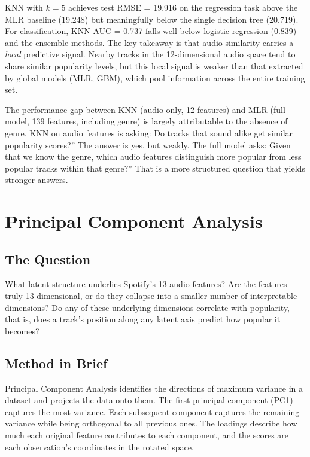 \documentclass[12pt, oneside]{book}
\begin{document}
KNN with $k = 5$ achieves test RMSE = 19.916 on the regression task above the MLR baseline (19.248) but meaningfully below the single decision tree (20.719). For classification, KNN AUC = 0.737 falls well below logistic regression (0.839) and the ensemble methods. The key takeaway is that audio similarity carries a \textit{local} predictive signal. Nearby tracks in the 12-dimensional audio space tend to share similar popularity levels, but this local signal is weaker than that extracted by global models (MLR, GBM), which pool information across the entire training set.
 
The performance gap between KNN (audio-only, 12 features) and MLR (full model, 139 features, including genre) is largely attributable to the absence of genre. KNN on audio features is asking: Do tracks that sound alike get similar popularity scores?'' The answer is yes, but weakly. The full model asks: Given that we know the genre, which audio features distinguish more popular from less popular tracks within that genre?'' That is a more structured question that yields stronger answers.
 
\chapter{Principal Component Analysis}
 
\section{The Question}
 
What latent structure underlies Spotify's 13 audio features? Are the features truly 13-dimensional, or do they collapse into a smaller number of interpretable dimensions? Do any of these underlying dimensions correlate with popularity, that is, does a track's position along any latent axis predict how popular it becomes?
 
\section{Method in Brief}
 
Principal Component Analysis identifies the directions of maximum variance in a dataset and projects the data onto them. The first principal component (PC1) captures the most variance. Each subsequent component captures the remaining variance while being orthogonal to all previous ones. The loadings describe how much each original feature contributes to each component, and the scores are each observation's coordinates in the rotated space.
 
\end{document}
